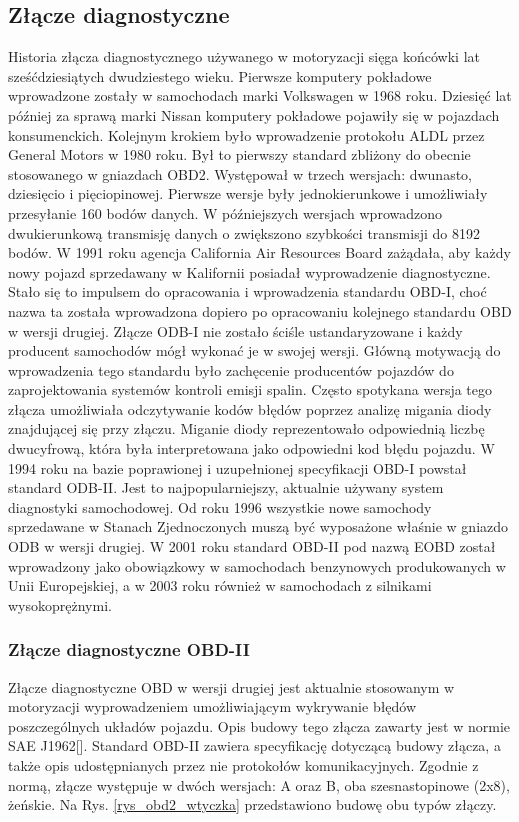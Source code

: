 \documentclass[12pt]{article} %
\numberwithin{equation}{subsection}
\numberwithin{figure}{section}
\numberwithin{table}{section}
\begin{document}
	\subsection{Złącze diagnostyczne}
		\hspace{0.5cm}Historia złącza diagnostycznego używanego w motoryzacji sięga końcówki lat sześćdziesiątych dwudziestego wieku. Pierwsze komputery pokładowe wprowadzone zostały w samochodach marki Volkswagen w 1968 roku. Dziesięć lat później za sprawą marki Nissan komputery pokładowe pojawiły się w pojazdach konsumenckich. Kolejnym krokiem było wprowadzenie protokołu ALDL  przez General Motors w 1980 roku. Był to pierwszy standard zbliżony do obecnie stosowanego w gniazdach OBD2. Występował w trzech wersjach: dwunasto, dziesięcio i pięciopinowej. Pierwsze wersje były jednokierunkowe i umożliwiały przesyłanie 160 bodów danych. W późniejszych wersjach wprowadzono dwukierunkową transmisję danych o zwiększono szybkości transmisji do 8192 bodów. W 1991 roku agencja California Air Resources Board zażądała, aby każdy nowy pojazd sprzedawany w Kalifornii posiadał wyprowadzenie diagnostyczne. Stało się to impulsem do opracowania i wprowadzenia standardu OBD-I, choć nazwa ta została wprowadzona dopiero po opracowaniu kolejnego standardu OBD w wersji drugiej. Złącze ODB-I nie zostało ściśle ustandaryzowane i każdy producent samochodów mógł wykonać je w swojej wersji. Główną motywacją do wprowadzenia tego standardu było zachęcenie producentów pojazdów do zaprojektowania systemów kontroli emisji spalin. Często spotykana wersja tego złącza umożliwiała odczytywanie kodów błędów poprzez analizę migania diody znajdującej się przy złączu. Miganie diody reprezentowało odpowiednią liczbę dwucyfrową, która była interpretowana jako odpowiedni kod błędu pojazdu. W 1994 roku na bazie poprawionej i uzupełnionej specyfikacji OBD-I powstał standard ODB-II. Jest to najpopularniejszy, aktualnie używany system diagnostyki samochodowej. Od roku 1996 wszystkie nowe samochody sprzedawane w Stanach Zjednoczonych muszą być wyposażone właśnie w gniazdo ODB w wersji drugiej. W 2001 roku standard OBD-II pod nazwą EOBD został wprowadzony jako obowiązkowy w samochodach benzynowych produkowanych w Unii Europejskiej, a w 2003 roku również w samochodach z silnikami wysokoprężnymi.
		
		\newpage
		
		\subsubsection{Złącze diagnostyczne OBD-II}
			\hspace{0.5cm}Złącze diagnostyczne OBD w wersji drugiej jest aktualnie stosowanym w motoryzacji wyprowadzeniem umożliwiającym wykrywanie błędów poszczególnych układów pojazdu. Opis budowy tego złącza zawarty jest w normie SAE J1962[\cite{saej1962}]. Standard OBD-II zawiera specyfikację dotyczącą budowy złącza, a także opis udostępnianych przez nie protokołów komunikacyjnych. Zgodnie z normą, złącze występuje w dwóch wersjach: A oraz B, oba szesnastopinowe (2x8), żeńskie. Na Rys. \ref{rys_obd2_wtyczka} przedstawiono budowę obu typów złączy.
		
\end{document}

